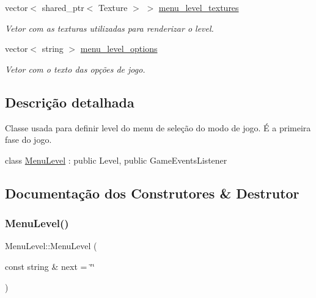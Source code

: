 \begin{DoxyCompactItemize}
\mbox{\label{classMenuLevel_a86bfd7ddf73258b6b322cbe9731b52d2}} 
vector$<$ shared\+\_\+ptr$<$ Texture $>$ $>$ \mbox{\hyperlink{classMenuLevel_a86bfd7ddf73258b6b322cbe9731b52d2}{menu\+\_\+level\+\_\+textures}}
\begin{DoxyCompactList}\small\item\em Vetor com as texturas utilizadas para renderizar o level. \end{DoxyCompactList}\item 
\mbox{\label{classMenuLevel_a2f6e3ee1e2fa7436f788d4b771f4dd36}} 
vector$<$ string $>$ \mbox{\hyperlink{classMenuLevel_a2f6e3ee1e2fa7436f788d4b771f4dd36}{menu\+\_\+level\+\_\+options}}
\begin{DoxyCompactList}\small\item\em Vetor com o texto das opções de jogo. \end{DoxyCompactList}\end{DoxyCompactItemize}


\subsection{Descrição detalhada}
Classe usada para definir level do menu de seleção do modo de jogo. É a primeira fase do jogo. 

class \mbox{\hyperlink{classMenuLevel}{Menu\+Level}} \+: public Level, public Game\+Events\+Listener 

\subsection{Documentação dos Construtores \& Destrutor}
\mbox{\label{classMenuLevel_a207c59fd8fdbb6252bdbbe0d8f73fcf6}} 
\subsubsection{\texorpdfstring{Menu\+Level()}{MenuLevel()}}
{\footnotesize\ttfamily Menu\+Level\+::\+Menu\+Level (\begin{DoxyParamCaption}\item[{const string \&}]{next = {\ttfamily \char`\"{}\char`\"{}} }\end{DoxyParamCaption})}



